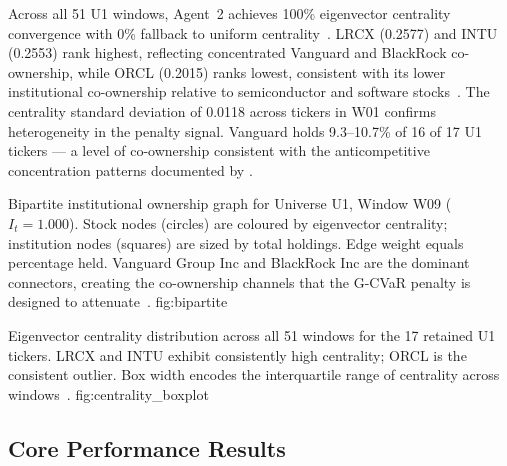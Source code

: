 Across all 51 U1 windows, Agent~2 achieves 100\% eigenvector centrality
convergence with 0\% fallback to uniform centrality~\citep{bonacich1987}.
LRCX (0.2577) and INTU (0.2553) rank highest, reflecting concentrated
Vanguard and BlackRock co-ownership, while ORCL (0.2015) ranks lowest,
consistent with its lower institutional co-ownership relative to
semiconductor and software stocks~\citep{azar2018,bebchuk2017}. The
centrality standard deviation of 0.0118 across tickers in W01 confirms
heterogeneity in the penalty signal. Vanguard holds 9.3--10.7\% of 16 of
17 U1 tickers — a level of co-ownership consistent with the anticompetitive
concentration patterns documented by \citet{azar2018}.

  {Bipartite institutional ownership graph for Universe U1, Window W09
   ($I_t = 1.000$). Stock nodes (circles) are coloured by eigenvector
   centrality; institution nodes (squares) are sized by total holdings.
   Edge weight equals percentage held. Vanguard Group Inc and BlackRock
   Inc are the dominant connectors, creating the co-ownership channels
   that the G-CVaR penalty is designed to
   attenuate~\citep{azar2018,billio2012}.}
  {fig:bipartite}

  {Eigenvector centrality distribution across all 51 windows for the
   17 retained U1 tickers. LRCX and INTU exhibit consistently high
   centrality; ORCL is the consistent outlier. Box width encodes the
   interquartile range of centrality across windows~\citep{bonacich1987}.}
  {fig:centrality_boxplot}

\subsection{Core Performance Results}

\begin{table}[htbp]
\centering
\caption{Performance comparison, Universe U1 (Table~9). Primary
         economic claim: CVaR@95\% reduction vs Equal Weight, not the
         Sharpe comparison vs Standard CVaR~\citep{rockafellar2000}.
         Equal Weight raw-return advantage reflects higher volatility
         (24.4\% vs 19.1\%).}
\label{tab:perf_u1}
\end{table}

